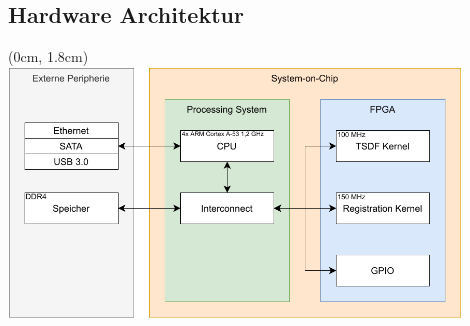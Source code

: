 \documentclass{beamer}
\begin{document}
\subsection{Hardware Architektur}
\begin{frame}{\subsecname}
\begin{center}
\begin{textblock*}{12.8cm}(0cm, 1.8cm)
\centering
\includegraphics[width=12cm]{images/Blockdiagram.pdf}
\end{textblock*}
\end{center}
\end{frame}



\end{document}
